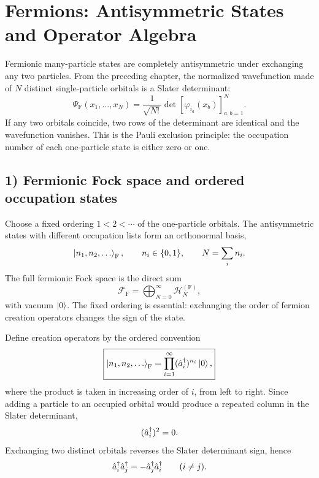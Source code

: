 \section{Fermions: Antisymmetric States and Operator Algebra}

Fermionic many-particle states are completely antisymmetric under exchanging any two particles. From the preceding chapter, the normalized wavefunction made of $N$ distinct single-particle orbitals is a Slater determinant:
\begin{equation}
\Psi_{\mathrm F}(x_1,\ldots,x_N)
=\frac1{\sqrt{N!}}\det[\varphi_{i_a}(x_b)]_{a,b=1}^N.
\end{equation}
If any two orbitals coincide, two rows of the determinant are identical and the wavefunction vanishes. This is the Pauli exclusion principle: the occupation number of each one-particle state is either zero or one.

\subsection*{1) Fermionic Fock space and ordered occupation states}

Choose a fixed ordering $1<2<\cdots$ of the one-particle orbitals. The antisymmetric states with different occupation lists form an orthonormal basis,
\begin{equation}
\left|n_1,n_2,\ldots\right\rangle_{\mathrm F},\qquad
n_i\in\{0,1\},\qquad N=\sum_i n_i.
\end{equation}
The full fermionic Fock space is the direct sum
\begin{equation}
\mathcal F_{\mathrm F}=\bigoplus_{N=0}^\infty\mathcal H_N^{(\mathrm F)},
\end{equation}
with vacuum $\left|0\right\rangle$. The fixed ordering is essential: exchanging the order of fermion creation operators changes the sign of the state.

Define creation operators by the ordered convention
\begin{equation}
\boxed{\left|n_1,n_2,\ldots\right\rangle_{\mathrm F}
=\prod_{i=1}^\infty(\hat{a}_i^\dagger)^{n_i}\left|0\right\rangle,}
\end{equation}
where the product is taken in increasing order of $i$, from left to right. Since adding a particle to an occupied orbital would produce a repeated column in the Slater determinant,
\begin{equation}
(\hat{a}_i^\dagger)^2=0.
\end{equation}
Exchanging two distinct orbitals reverses the Slater determinant sign, hence
\begin{equation}
\hat{a}_i^\dagger\hat{a}_j^\dagger=-\hat{a}_j^\dagger\hat{a}_i^\dagger
\qquad(i\ne j).
\end{equation}

